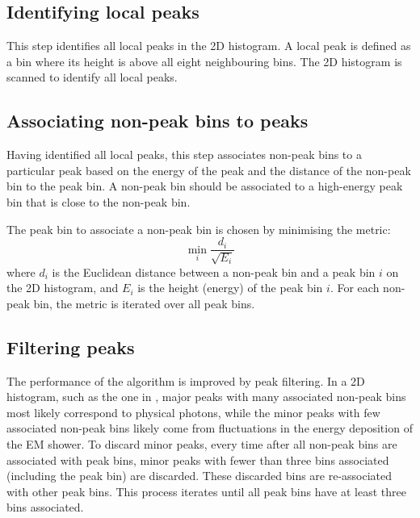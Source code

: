 \subsection{Identifying local peaks}

This step identifies all local peaks in the 2D histogram. A local peak is defined as a bin where its height is above all eight neighbouring bins. The 2D histogram is scanned to identify all local peaks. %
\subsection{Associating non-peak bins to peaks}

Having identified all local peaks, this step associates non-peak bins to a particular peak based on the energy of the peak and the distance of the non-peak bin to the peak bin. A non-peak bin should be associated to a high-energy peak bin that is close to the non-peak bin.

The peak bin to associate a non-peak bin is chosen by minimising the metric:
\begin{equation}
\min_{i}\frac{d_{i}}{\sqrt{E_{i}}}
\end{equation}
where $d_{i}$ is the Euclidean distance between a non-peak bin and a  peak bin $i$ on the 2D histogram, and $E_{i}$ is the height (energy) of the peak bin $i$. For each non-peak bin, the metric is iterated over all peak bins. %


\subsection{Filtering peaks}

The performance of the \peakFinding algorithm is improved by peak filtering. In a 2D histogram, such as the one in , major peaks with many associated non-peak bins most likely correspond to physical photons, while the minor peaks with few associated non-peak bins  likely come from fluctuations in the energy deposition of the EM shower. To discard minor peaks, every time after all non-peak bins are associated with peak bins, minor peaks with fewer than three bins associated (including the peak bin) are discarded. These discarded bins are re-associated with other peak bins. This  process iterates until all peak bins have at least three bins associated.

